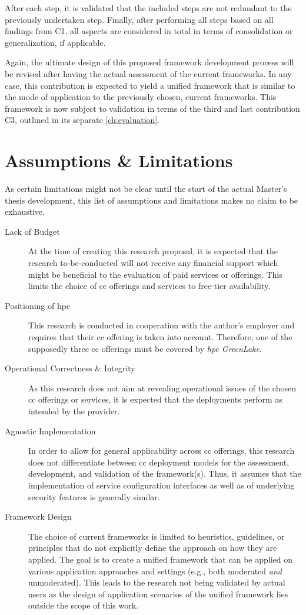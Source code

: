 After each step, it is validated that the included steps are not redundant to the previously undertaken step. Finally, after performing all steps based on all findings from C1, all aspects are considered in total in terms of consolidation or generalization, if applicable.

Again, the ultimate design of this proposed framework development process will be revised after having the actual assessment of the current frameworks. In any case, this contribution is expected to yield a unified framework that is similar to the mode of application to the previously chosen, current frameworks. This framework is now subject to validation in terms of the third and last contribution C3, outlined in its separate \autoref{ch:evaluation}.

\section{Assumptions \& Limitations} \label{sec:approach-assumptions}
As certain limitations might not be clear until the start of the actual Master's thesis development, this list of assumptions and limitations makes no claim to be exhaustive.

\begin{description}
	\item[Lack of Budget] At the time of creating this research proposal, it is expected that the research to-be-conducted will not receive any financial support which might be beneficial to the evaluation of paid services or offerings. This limits the choice of \ac{cc} offerings and services to free-tier availability. 
	\item[Positioning of \acs{hpe}] This research is conducted in cooperation with the author's employer and requires that their \ac{cc} offering is taken into account. Therefore, one of the supposedly three \ac{cc} offerings must be covered by \textit{\acs{hpe} GreenLake}. 
	\item[Operational Correctness \& Integrity] As this research does not aim at revealing operational issues of the chosen \ac{cc} offerings or services, it is expected that the deployments perform as intended by the provider.
	\item[Agnostic Implementation] In order to allow for general applicability across \ac{cc} offerings, this research does not differentiate between \ac{cc} deployment models for the assessment, development, and validation of the framework(s). Thus, it assumes that the implementation of service configuration interfaces as well as of underlying security features is generally similar.
	\item[Framework Design] The choice of current frameworks is limited to heuristics, guidelines, or principles that do not explicitly define the approach on how they are applied. The goal is to create a unified framework that can be applied on various application approaches and settings (e.g., both moderated \textit{and} unmoderated). This leads to the research not being validated by actual users as the design of application scenarios of the unified framework lies outside the scope of this work.
\end{description}

